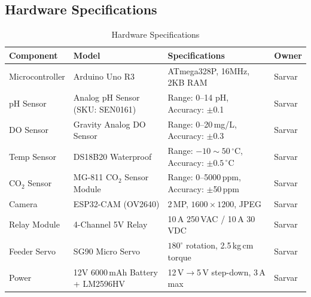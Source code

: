 \documentclass[12pt,a4paper,oneside]{article}
\begin{document}
\subsection{Hardware Specifications}
\begin{table}[H]
    \centering
    \begin{tabularx}{\textwidth}{llXl}
        \toprule
        \textbf{Component} & \textbf{Model} & \textbf{Specifications} & \textbf{Owner} \\
        \midrule
        Microcontroller & Arduino Uno R3 & ATmega328P, 16MHz, 2KB RAM & Sarvar \\
        pH Sensor & Analog pH Sensor (SKU: SEN0161) & Range: 0--14 pH, Accuracy: $\pm$0.1 & Sarvar \\
        DO Sensor & Gravity Analog DO Sensor & Range: 0--20\,mg/L, Accuracy: $\pm$0.3 & Sarvar \\
        Temp Sensor & DS18B20 Waterproof & Range: $-10\sim50\,^\circ$C, Accuracy: $\pm0.5\,^\circ$C & Sarvar \\
        CO$_2$ Sensor & MG-811 CO$_2$ Sensor Module & Range: 0--5000\,ppm, Accuracy: $\pm$50\,ppm & Sarvar \\
        Camera & ESP32-CAM (OV2640) & 2\,MP, $1600\times1200$, JPEG & Sarvar \\
        Relay Module & 4-Channel 5V Relay & 10\,A 250\,VAC / 10\,A 30\,VDC & Sarvar \\
        Feeder Servo & SG90 Micro Servo & $180^\circ$ rotation, 2.5\,kg\,cm torque & Sarvar \\
        Power & 12V 6000\,mAh Battery + LM2596HV & 12\,V$\rightarrow$5\,V step-down, 3\,A max & Sarvar \\
        \bottomrule
    \end{tabularx}
    \caption{Hardware Specifications}
\end{table}
\end{document}
